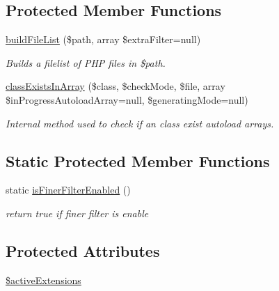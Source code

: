 \subsection*{\-Protected \-Member \-Functions}
\begin{DoxyCompactItemize}
\item 
\hyperlink{classextension_1_1ezadvancedautoload_1_1pv_1_1classes_1_1e_z_autoload_generator_a3ae86ef7695ac2deecb15af62207f44c}{build\-File\-List} (\$path, array \$extra\-Filter=null)
\begin{DoxyCompactList}\small\item\em \-Builds a filelist of \-P\-H\-P files in \$path. \end{DoxyCompactList}\item 
\hyperlink{classextension_1_1ezadvancedautoload_1_1pv_1_1classes_1_1e_z_autoload_generator_afc186d5d45f20bf67479407e87be6ad5}{class\-Exists\-In\-Array} (\$class, \$check\-Mode, \$file, array \$in\-Progress\-Autoload\-Array=null, \$generating\-Mode=null)
\begin{DoxyCompactList}\small\item\em \-Internal method used to check if an class exist autoload arrays. \end{DoxyCompactList}\end{DoxyCompactItemize}
\subsection*{\-Static \-Protected \-Member \-Functions}
\begin{DoxyCompactItemize}
\item 
static \hyperlink{classextension_1_1ezadvancedautoload_1_1pv_1_1classes_1_1e_z_autoload_generator_afd315c7aa866c6a1bfcf75ae27ce8c3b}{is\-Finer\-Filter\-Enabled} ()
\begin{DoxyCompactList}\small\item\em return true if finer filter is enable \end{DoxyCompactList}\end{DoxyCompactItemize}
\subsection*{\-Protected \-Attributes}
\begin{DoxyCompactItemize}
\item 
\hyperlink{classextension_1_1ezadvancedautoload_1_1pv_1_1classes_1_1e_z_autoload_generator_a600be69823d714cae92e7e3e3f4ad87b}{\$active\-Extensions}
\end{DoxyCompactItemize}

